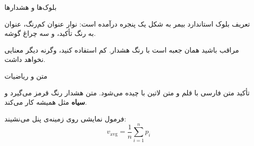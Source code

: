 \begin{frame}{بلوک‌ها و هشدارها}
    \begin{block}{تعریف}
        بلوک استاندارد بیمر به شکل یک پنجره درآمده است: نوار عنوان کم‌رنگ،
        عنوان به رنگ تأکید، و سه چراغ گوشه.
    \end{block}

    \vspace{0.3cm}

    \begin{alertblock}{مراقب باشید}
         همان جعبه است با رنگ هشدار. کم استفاده کنید،
        وگرنه دیگر معنایی نخواهد داشت.
    \end{alertblock}
\end{frame}

\begin{frame}{متن و ریاضیات}
    \begin{panel}{تأکید}
        متن فارسی با قلم  و متن لاتین با  چیده می‌شود.
        \alert{متن هشدار} رنگ قرمز می‌گیرد و \textbf{سیاه} مثل همیشه کار می‌کند.

        \vspace{0.2cm}
        فرمول نمایشی روی زمینه‌ی پنل می‌نشیند:
        \[
            v_{\text{avg}} = \frac{1}{n}\sum_{i=1}^{n} p_i
        \]
    \end{panel}
\end{frame}

